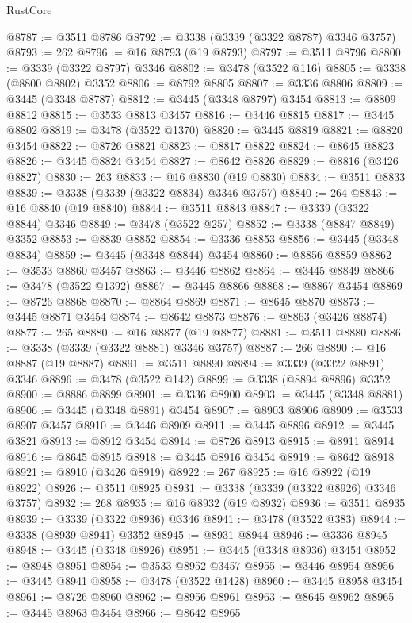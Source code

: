 \begin{lexlean}{RustCore}
\begin{coremodule}
@8787 := @3511 @8786
@8792 := @3338 (@3339 (@3322 @8787) @3346 @3757)
@8793 := 262
@8796 := @16 @8793 (@19 @8793)
@8797 := @3511 @8796
@8800 := @3339 (@3322 @8797) @3346
@8802 := @3478 (@3522 @116)
@8805 := @3338 (@8800 @8802) @3352
@8806 := @8792 @8805
@8807 := @3336 @8806
@8809 := @3445 (@3348 @8787)
@8812 := @3445 (@3348 @8797) @3454
@8813 := @8809 @8812
@8815 := @3533 @8813 @3457
@8816 := @3446 @8815
@8817 := @3445 @8802
@8819 := @3478 (@3522 @1370)
@8820 := @3445 @8819
@8821 := @8820 @3454
@8822 := @8726 @8821
@8823 := @8817 @8822
@8824 := @8645 @8823
@8826 := @3445 @8824 @3454
@8827 := @8642 @8826
@8829 := @8816 (@3426 @8827)
@8830 := 263
@8833 := @16 @8830 (@19 @8830)
@8834 := @3511 @8833
@8839 := @3338 (@3339 (@3322 @8834) @3346 @3757)
@8840 := 264
@8843 := @16 @8840 (@19 @8840)
@8844 := @3511 @8843
@8847 := @3339 (@3322 @8844) @3346
@8849 := @3478 (@3522 @257)
@8852 := @3338 (@8847 @8849) @3352
@8853 := @8839 @8852
@8854 := @3336 @8853
@8856 := @3445 (@3348 @8834)
@8859 := @3445 (@3348 @8844) @3454
@8860 := @8856 @8859
@8862 := @3533 @8860 @3457
@8863 := @3446 @8862
@8864 := @3445 @8849
@8866 := @3478 (@3522 @1392)
@8867 := @3445 @8866
@8868 := @8867 @3454
@8869 := @8726 @8868
@8870 := @8864 @8869
@8871 := @8645 @8870
@8873 := @3445 @8871 @3454
@8874 := @8642 @8873
@8876 := @8863 (@3426 @8874)
@8877 := 265
@8880 := @16 @8877 (@19 @8877)
@8881 := @3511 @8880
@8886 := @3338 (@3339 (@3322 @8881) @3346 @3757)
@8887 := 266
@8890 := @16 @8887 (@19 @8887)
@8891 := @3511 @8890
@8894 := @3339 (@3322 @8891) @3346
@8896 := @3478 (@3522 @142)
@8899 := @3338 (@8894 @8896) @3352
@8900 := @8886 @8899
@8901 := @3336 @8900
@8903 := @3445 (@3348 @8881)
@8906 := @3445 (@3348 @8891) @3454
@8907 := @8903 @8906
@8909 := @3533 @8907 @3457
@8910 := @3446 @8909
@8911 := @3445 @8896
@8912 := @3445 @3821
@8913 := @8912 @3454
@8914 := @8726 @8913
@8915 := @8911 @8914
@8916 := @8645 @8915
@8918 := @3445 @8916 @3454
@8919 := @8642 @8918
@8921 := @8910 (@3426 @8919)
@8922 := 267
@8925 := @16 @8922 (@19 @8922)
@8926 := @3511 @8925
@8931 := @3338 (@3339 (@3322 @8926) @3346 @3757)
@8932 := 268
@8935 := @16 @8932 (@19 @8932)
@8936 := @3511 @8935
@8939 := @3339 (@3322 @8936) @3346
@8941 := @3478 (@3522 @383)
@8944 := @3338 (@8939 @8941) @3352
@8945 := @8931 @8944
@8946 := @3336 @8945
@8948 := @3445 (@3348 @8926)
@8951 := @3445 (@3348 @8936) @3454
@8952 := @8948 @8951
@8954 := @3533 @8952 @3457
@8955 := @3446 @8954
@8956 := @3445 @8941
@8958 := @3478 (@3522 @1428)
@8960 := @3445 @8958 @3454
@8961 := @8726 @8960
@8962 := @8956 @8961
@8963 := @8645 @8962
@8965 := @3445 @8963 @3454
@8966 := @8642 @8965

\end{coremodule}
\end{lexlean}
